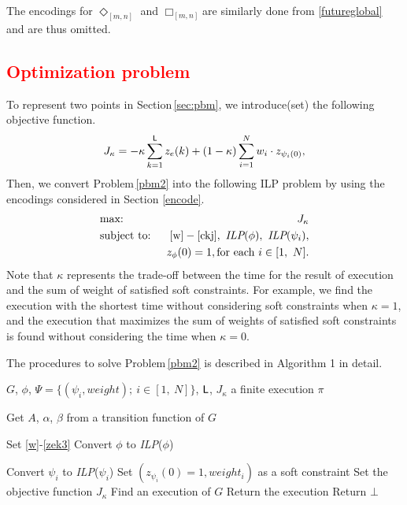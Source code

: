 \documentclass[journal,twoside,web]{IEEEtran}
\newcommand{\req}[1]{\eqref{#1}}
\newcommand{\rpbm}[1]{Problem\,\ref{#1}}
\newcommand{\rsec}[1]{Section\,\ref{#1}}
\newcommand{\Len}{{\sf L}}
\newcommand{\red}[1]{\textcolor{red}{#1}}
\begin{document}
The encodings for $\Diamond_{[m,n]}$ and $\Box_{[m,n]}$are similarly done from  \req{futureglobal} and are thus omitted. 
%
%
\red{\subsection{Optimization problem}}
%
To represent two points in \rsec{sec:pbm}, we introduce(set) the following objective function. 
\begin{align}\label{j1}
J_\kappa= 
-\kappa\sum_{k=1}^{\Len}z_e(k) + (1-\kappa)\sum_{i=1}^{N} w_{i}\cdot z_{\psi_{i}(0)}, 
\end{align}
Then, we convert \rpbm{pbm2} into the following ILP problem by using the encodings considered in Section \ref{encode}. 
%
%
%
\begin{eqnarray}
&\mbox{max: }&J_\kappa \notag \\
&\mbox{subject to: }&\req{w}-\req{ckj},\ \textit{ILP}(\phi),\ \textit{ILP}(\psi_i),\notag\\
&&z_{\phi} (0) = 1, {\rm{for\ each\ }}  i \in [1,\ N].\notag
\end{eqnarray}
%
%
Note that $\kappa$ represents the trade-off between the time for the result of execution and the sum of weight of satisfied soft constraints.
For example, we find the execution with the shortest time without considering soft constraints when $\kappa=1$, and the execution that maximizes the sum of weights of satisfied soft constraints is found without considering the time when $\kappa=0$.

The procedures to solve \rpbm{pbm2} is described in Algorithm 1 in detail. 
%
%
%
\begin{algorithm}
\caption{: FIND($G,\phi,\Psi,\Len,J_\kappa$): algorithm to solve \rpbm{pbm2}} \label{alg_solve_maxsat}
\begin{algorithmic}
%
\Require $G$, $\phi$, $\Psi=\{(\psi_i,weight);\ i\in[1,\ N]\}$, $\Len$, $J_\kappa$
\Ensure a finite execution $\pi$ 

\State Get $A$, $\alpha$, $\beta$ from a transition function of $G$

\State Set \req{w}-\req{zek3} 
\State Convert $\phi$ to \textit{ILP}($\phi$)

	\State Convert $\psi_{i}$ to \textit{ILP}($\psi_{i}$) 
	\State Set $(z_{\psi_i}(0)=1,weight_i)$ as a soft constraint
	\EndFor
\EndIf
\State Set the objective function $J_\kappa$
\State Find an execution of $G$
	\State Return the execution 
\Else
	\State  Return $\bot$
\EndIf
\end{algorithmic}
\end{algorithm}
%
%
\end{document}
